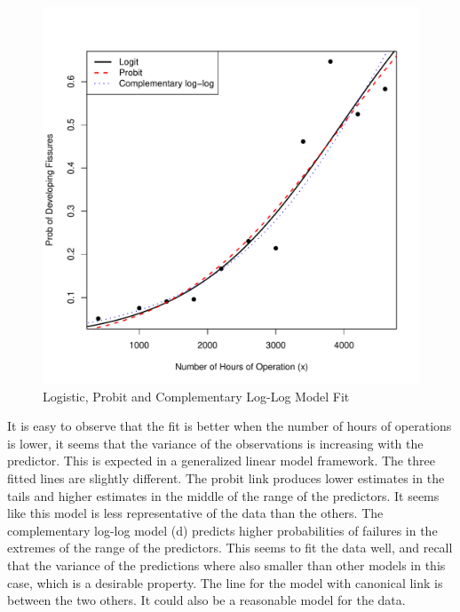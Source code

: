 \begin{solution}{2.9}
\begin{enumerate}
\begin{figure}[htbp]
\begin{center}
\begin{knitrout}
\color{fgcolor}
\includegraphics[width=\maxwidth]{figure/unnamed-chunk-17-1}

\end{knitrout}
\end{center}
\caption{Logistic, Probit and Complementary Log-Log Model Fit} \label{fig:glm:modfit}
\end{figure}

It is easy to observe that the fit is better when the number of hours of operations is lower, it seems that the variance of the observations is increasing with the predictor. This is expected in a generalized linear model framework. The three fitted lines are slightly different. The probit link produces lower estimates in the tails and higher estimates in the middle of the range of the predictors. It seems like this model is less representative of the data than the others. The complementary log-log model (d) predicts higher probabilities of failures in the extremes of the range of the predictors. This seems to fit the data well, and recall that the variance of the predictions where also smaller than other models in this case, which is a desirable property. The line for the model with canonical link is between the two others. It could also be a reasonable model for the data.

\end{enumerate}
\end{solution}
